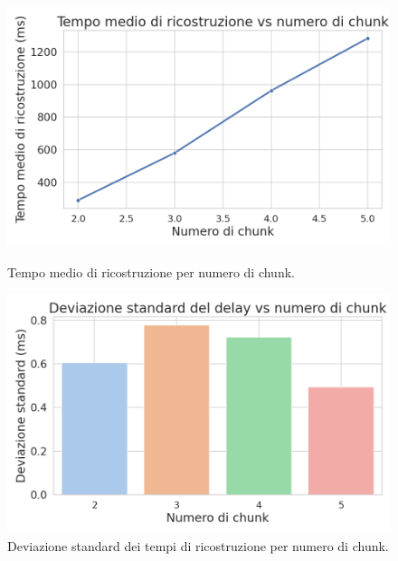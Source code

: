 \documentclass[12pt,a4paper,twoside]{book}
\begin{document}
\begin{figure}[H]
    \centering
    \begin{minipage}{0.47\textwidth}
        \centering
        \includegraphics[width=\textwidth]{img/tests/T2/T2-avg-time.png}
        \caption{Tempo medio di ricostruzione per numero di chunk.}
        \label{fig:segmentation-reconstruction-avg-time}
    \end{minipage}
    \hfill
    \begin{minipage}{0.47\textwidth}
        \centering
        \includegraphics[width=\textwidth]{img/tests/T2/T2-sd.png}
        \caption{Deviazione standard dei tempi di ricostruzione per numero di chunk.}
        \label{fig:segmentation-reconstruction-sd}
    \end{minipage}
\end{figure}
\end{document}
